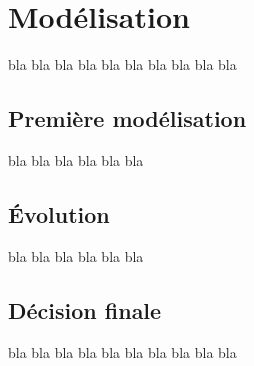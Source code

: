 \section{Modélisation}
bla bla bla bla bla bla bla bla bla bla 
\subsection{Première modélisation}
bla bla bla bla bla bla 
\subsection{Évolution}
bla bla bla bla bla bla 
\subsection{Décision finale}
bla bla bla bla bla bla bla bla bla bla 